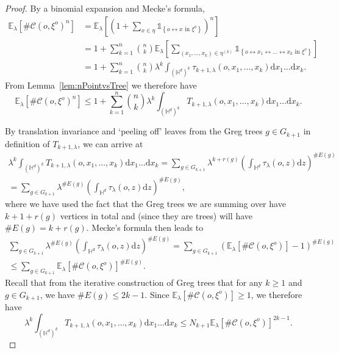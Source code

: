 \documentclass[10pt,a4paper,dvipsnames]{article}
\theoremstyle{definition}
\theoremstyle{remark}
\newcommand{\ela}{\mathbb E_{\lambda}}
\newcommand{\HypDim}{{\mathbb{H}^d}}
\newcommand{\dd}{\mathrm{d}} %
\newcommand{\C}{\mathscr {C}}
\newcommand{\conn}[3]{#1 \longleftrightarrow #2\textrm { in } #3}
\newcommand{\tlam}{\tau_\lambda}
\newcommand{\Id}{\mathds 1}
\newcommand{\orig}{o}
\numberwithin{equation}{section}
\begin{document}
\begin{proof}    
    By a binomial expansion and Mecke's formula,
    \begin{align}
        \ela\left[\#\C\left(\orig,\xi^{\orig}\right)^n\right] &= \ela\left[\left(1+\sum_{x\in\eta}\Id_{\left\{\conn{\orig}{x}{\xi^{\orig}}\right\}}\right)^n\right]\nonumber\\
        &= 1+ \sum_{k=1}^n \binom{n}{k} \ela\left[\sum_{\left(x_1,\ldots,x_k\right)\in\eta^{(k)}}\Id_{\left\{\orig\longleftrightarrow x_1 \longleftrightarrow \ldots \longleftrightarrow x_k \text{ in }\xi^\orig\right\}}\right]\nonumber\\
        &= 1  + \sum^n_{k=1}\binom{n}{k}\lambda^k\int_{\left(\HypDim\right)^k}\tau_{k+1,\lambda}\left(\orig,x_1,\ldots,x_k\right)\dd x_1\ldots \dd x_k.\label{eqn:NMomentEquality}
    \end{align}
From Lemma~\ref{lem:nPointvsTree} we therefore have
\begin{equation}
    \ela\left[\#\C\left(\orig,\xi^{\orig}\right)^n\right] \leq 1  + \sum^n_{k=1}\binom{n}{k}\lambda^k\int_{\left(\HypDim\right)^k}T_{k+1,\lambda}\left(\orig,x_1,\ldots,x_k\right)\dd x_1\ldots \dd x_k.
\end{equation}


By translation invariance and `peeling off' leaves from the Greg trees $g\in G_{k+1}$ in definition of $T_{k+1,\lambda}$, we can arrive at
\begin{multline}
    \lambda^k\int_{\left(\HypDim\right)^k}T_{k+1,\lambda}\left(\orig,x_1,\ldots,x_k\right) \dd x_1\ldots \dd x_k  = \sum_{g\in G_{k+1}}\lambda^{k+r(g)}\left(\int_{\HypDim}\tlam\left(\orig,z\right)\dd z\right)^{\#E(g)}\\
    = \sum_{g\in G_{k+1}}\lambda^{\#E(g)}\left(\int_{\HypDim}\tlam\left(\orig,z\right)\dd z\right)^{\#E(g)},
\end{multline}
where we have used the fact that the Greg trees we are summing over have $k+1+r(g)$ vertices in total and (since they are trees) will have $\# E(g)=k+r(g)$. Mecke's formula then leads to
\begin{multline}
    \sum_{g\in G_{k+1}}\lambda^{\#E(g)}\left(\int_{\HypDim}\tlam\left(\orig,z\right)\dd z\right)^{\#E(g)} = \sum_{g\in G_{k+1}}\left(\ela\left[\#\C\left(\orig,\xi^{\orig}\right)\right]-1\right)^{\#E(g)}\\
    \leq\sum_{g\in G_{k+1}}\ela\left[\#\C\left(\orig,\xi^{\orig}\right)\right]^{\#E(g)}.
\end{multline}
Recall that from the iterative construction of Greg trees that for any $k\geq 1$ and $g\in G_{k+1}$, we have $\# E(g) \leq 2k-1$. Since $\ela\left[\#\C\left(\orig,\xi^{\orig}\right)\right]\geq 1$, we therefore have
\begin{equation}
    \lambda^k\int_{\left(\HypDim\right)^k}T_{k+1,\lambda}\left(\orig,x_1,\ldots,x_k\right) \dd x_1\ldots \dd x_k \leq N_{k+1}\ela\left[\#\C\left(\orig,\xi^{\orig}\right)\right]^{2k-1}.
\end{equation}


\end{proof}
\end{document}
